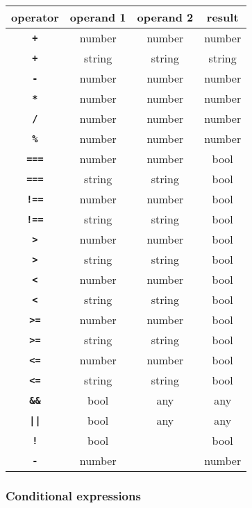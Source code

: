 \begin{center}
\begin{tabular}{c|c|c|c}
operator & operand 1 & operand 2 & result\\ \hline
\texttt{\textbf{+}} & number   & number     & number\\
\texttt{\textbf{+}} & string   & string     & string\\
\texttt{\textbf{-}} & number   & number     & number\\
\texttt{\textbf{*}} & number   & number     & number\\
\texttt{\textbf{/}} & number   & number     & number\\
\texttt{\textbf{\%}} & number   & number     & number\\
\texttt{\textbf{===}} & number   & number     & bool\\
\texttt{\textbf{===}} & string   & string     & bool\\
\texttt{\textbf{!==}} & number   & number     & bool\\
\texttt{\textbf{!==}} & string   & string     & bool\\
\texttt{\textbf{>}} & number   & number     & bool\\
\texttt{\textbf{>}} & string   & string     & bool\\
\texttt{\textbf{<}} & number   & number     & bool\\
\texttt{\textbf{<}} & string   & string     & bool\\
\texttt{\textbf{>=}} & number   & number     & bool\\
\texttt{\textbf{>=}} & string   & string     & bool\\
\texttt{\textbf{<=}}    & number   & number     & bool\\
\texttt{\textbf{<=}} & string   & string     & bool\\
\texttt{\textbf{\&\&}} & bool & any & any \\
\texttt{\textbf{||}}   & bool & any & any \\
\texttt{\textbf{!}}    & bool &      & bool\\
\texttt{\textbf{-}}    & number &    & number
\end{tabular}
\end{center}

\subsubsection*{Conditional expressions}

